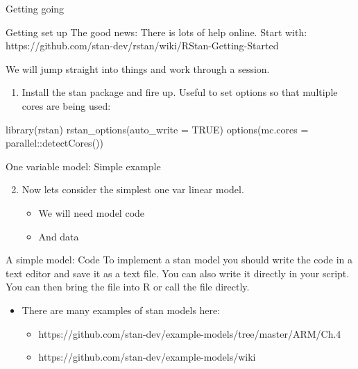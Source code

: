 \documentclass[
  11pt,
  ignorenonframetext,
]{beamer}
\newenvironment{Shaded}{\begin{snugshade}}{\end{snugshade}}
\newcommand{\AttributeTok}[1]{\textcolor[rgb]{0.40,0.45,0.13}{#1}}
\newcommand{\ConstantTok}[1]{\textcolor[rgb]{0.56,0.35,0.01}{#1}}
\newcommand{\FunctionTok}[1]{\textcolor[rgb]{0.28,0.35,0.67}{#1}}
\newcommand{\NormalTok}[1]{\textcolor[rgb]{0.00,0.23,0.31}{#1}}
\newcommand{\SpecialCharTok}[1]{\textcolor[rgb]{0.37,0.37,0.37}{#1}}
\providecommand{\tightlist}{%
  \setlength{\itemsep}{0pt}\setlength{\parskip}{0pt}}\usepackage{longtable,booktabs,array}
\begin{document}
\begin{frame}{Getting going}
\protect\hypertarget{getting-going}{}
\end{frame}

\begin{frame}[fragile]{Getting set up}
\protect\hypertarget{getting-set-up}{}
The good news: There is lots of help online. Start with:
https://github.com/stan-dev/rstan/wiki/RStan-Getting-Started

We will jump straight into things and work through a session.

\begin{enumerate}
\tightlist
\item
  Install the stan package and fire up. Useful to set options so that
  multiple cores are being used:
\end{enumerate}

\begin{Shaded}
\begin{Highlighting}[]
\FunctionTok{library}\NormalTok{(rstan)}
\FunctionTok{rstan\_options}\NormalTok{(}\AttributeTok{auto\_write =} \ConstantTok{TRUE}\NormalTok{)}
\FunctionTok{options}\NormalTok{(}\AttributeTok{mc.cores =}\NormalTok{ parallel}\SpecialCharTok{::}\FunctionTok{detectCores}\NormalTok{())}
\end{Highlighting}
\end{Shaded}
\end{frame}

\begin{frame}{One variable model: Simple example}
\protect\hypertarget{one-variable-model-simple-example}{}
\begin{enumerate}
\setcounter{enumi}{1}
\tightlist
\item
  Now lets consider the simplest one var linear model.

  \begin{itemize}
  \tightlist
  \item
    We will need model code
  \item
    And data
  \end{itemize}
\end{enumerate}
\end{frame}

\begin{frame}{A simple model: Code}
\protect\hypertarget{a-simple-model-code}{}
To implement a stan model you should write the code in a text editor and
save it as a text file. You can also write it directly in your script.
You can then bring the file into R or call the file directly.

\begin{itemize}
\tightlist
\item
  There are many examples of stan models here:

  \begin{itemize}
  \tightlist
  \item
    https://github.com/stan-dev/example-models/tree/master/ARM/Ch.4
  \item
    https://github.com/stan-dev/example-models/wiki
  \end{itemize}
\end{itemize}
\end{frame}
\end{document}

